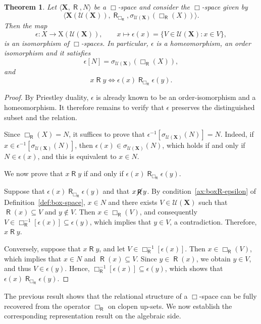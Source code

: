 \documentclass[10pt,a4paper]{amsart}
\newtheorem{theorem}{Theorem}[section]
\DeclareMathOperator{\R}{\mathsf{R}}
\DeclareMathOperator{\notR}{\cancel{ \R}}
\newcommand{\X}{\mathbf{X}}
\newcommand{\U}{\mathcal{U}}
\begin{document}
\begin{theorem}
\label{thm:epsilon-box-morphism}
Let $\langle \X,\R,N\rangle$ be a $\Box$-space and consider the $\Box$-space given by 
\[
\langle \X(\U(\X)), \R_{\Box_{\R}}, \sigma_{\U(\X)}(\Box_{\R}(X))\rangle.
\] 
Then the map
\[
\epsilon \colon X \longrightarrow \mathrm{X}(\U(\X)), \qquad x \mapsto \epsilon(x) = \{V \in \U(\X) : x \in V\},
\]
is an isomorphism of $\Box$-spaces. In particular, $\epsilon$ is a homeomorphism, an order isomorphism and it satisfies
\[
\epsilon[N]=\sigma_{\U(\X)}(\Box_{\R}(X)),
\]
and 
\[
x \R y\iff \epsilon(x)\R_{\Box_{\R}} \epsilon(y).
\]
\end{theorem}

\begin{proof}
By Priestley duality, $\epsilon$ is already known to be an order-isomorphism and a homeomorphism. It therefore remains to verify that $\epsilon$ preserves the distinguished subset and the relation.

Since $\Box_{\R}(X)=N$, it suffices to prove that $\epsilon^{-1}[\sigma_{\U(\X)}(N)] = N$. Indeed, if $x \in \epsilon^{-1}[\sigma_{\U(\X)}(N)]$, then $\epsilon(x) \in \sigma_{\U(\X)}(N)$, which holds if and only if $N \in \epsilon(x)$, and this is equivalent to $x \in N$.

We now prove that $x \R y$ if and only if $\epsilon(x)\R_{\Box_{\R}} \epsilon(y)$.

Suppose that $\epsilon(x)\R_{\Box_{\R}} \epsilon(y)$ and that $x \notR y$. By condition~\ref{ax:boxR-epsilon} of Definition~\ref{def:box-space}, $x \in N$ and there exists $V \in \U(\X)$ such that $\R(x) \subseteq V$ and $y \notin V$. Then $x \in \Box_{\R}(V)$, and consequently $V \in \Box_{\R}^{-1}[\epsilon(x)] \subseteq \epsilon(y)$, which implies that $y \in V$, a contradiction. Therefore, $x\R y$.

Conversely, suppose that $x\R y$, and let $V \in \Box_{\R}^{-1}[\epsilon(x)]$. Then $x \in \Box_{\R}(V)$, which implies that $x \in N$ and $\R(x) \subseteq V$. Since $y \in \R(x)$, we obtain $y \in V$, and thus $V \in \epsilon(y)$. Hence, $\Box_{\R}^{-1}[\epsilon(x)] \subseteq \epsilon(y)$, which shows that $\epsilon(x)\R_{\Box_{\R}} \epsilon(y)$.
\end{proof}


The previous result shows that the relational structure of a $\Box$-space can be fully recovered from the operator $\Box_{\R}$ on clopen up-sets. We now establish the corresponding representation result on the algebraic side.
\end{document}
